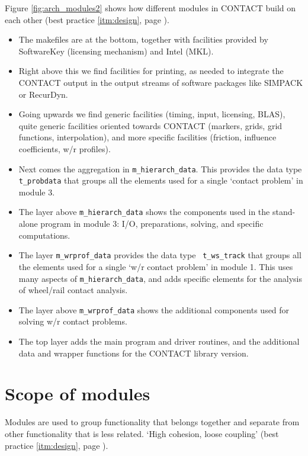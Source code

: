 \documentclass[12pt]{report}
\begin{document}
Figure \ref{fig:arch_modules2} shows how different modules in CONTACT build
on each other (best practice \ref{itm:design}, page \pageref{itm:design}). 
\begin{itemize}
\item The makefiles are at the bottom, together with facilities provided
        by SoftwareKey (licensing mechanism) and Intel (MKL). 
\item Right above this we find facilities for printing, as needed to
        integrate the CONTACT output in the output streams of software
        packages like SIMPACK or RecurDyn.
\item Going upwards we find generic facilities (timing, input, licensing,
        BLAS), quite generic facilities oriented towards CONTACT (markers,
        grids, grid functions, interpolation), and more specific facilities
        (friction, influence coefficients, w/r profiles).
\item Next comes the aggregation in {\tt m\_hierarch\_data}. This provides
        the data type {\tt t\_probdata} that groups all the elements used
        for a single `contact problem' in module 3.
\item The layer above {\tt m\_hierarch\_data} shows the components used
        in the stand-alone program in module 3: I/O, preparations, solving,
        and specific computations.
\item The layer {\tt m\_wrprof\_data} provides the data type {\tt
        t\_ws\_track} that groups all the elements used for a single
        `w/r contact problem' in module 1. This uses many aspects of
        {\tt m\_\-hierarch\_\-data}, and adds specific elements for the analysis
        of wheel/rail contact analysis.
\item The layer above {\tt m\_wrprof\_data} shows the additional components
        used for solving w/r contact problems.
\item The top layer adds the main program and driver routines, and the
        additional data and wrapper functions for the CONTACT library
        version.
\end{itemize}


\section{Scope of modules}

Modules are used to group functionality that belongs together and separate
from other functionality that is less related. `High cohesion, loose
coupling' (best practice \ref{itm:design}, page \pageref{itm:design}).
\end{document}
